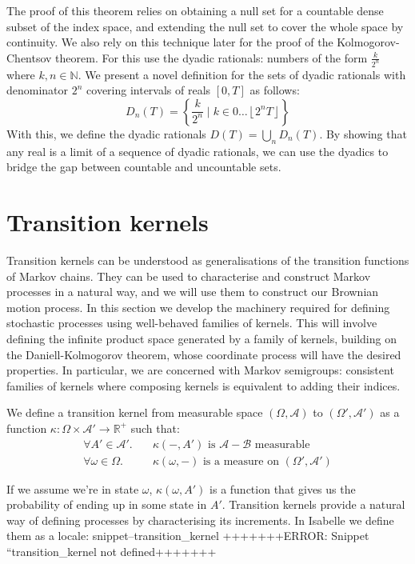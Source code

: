 \documentclass[orivec, envcountsame]{llncs}
\newcommand{\Snippet}[1]{%
\ifcsname snippet--#1\endcsname{\csname snippet--#1\endcsname}%
\else+++++++ERROR: Snippet ``#1 not defined+++++++ \fi}
\begin{document}
The proof of this theorem relies on obtaining a null set for a countable dense subset of the index space, and extending the null set to cover the whole space by continuity. We also rely on this technique later for the proof of the Kolmogorov-Chentsov theorem. For this use the dyadic rationals: numbers of the form \(\frac{k}{2^n}\) where \(k, n\in\mathbb{N}\). We present a novel definition for the sets of dyadic rationals with denominator \(2^n\) covering intervals of reals \([0,T]\) as follows:
 \[D_n(T) = \left\{\frac{k}{2^n} \mid k \in 0 \ldots\left\lfloor 2^nT \right\rfloor\right\}\]
With this, we define the dyadic rationals \(D(T)= \bigcup_n D_n(T)\). By showing that any real is a limit of a sequence of dyadic rationals, we can use the dyadics to bridge the gap between countable and uncountable sets.

\section{Transition kernels}\label{sec:kernel}
Transition kernels can be understood as generalisations of the transition functions of Markov chains. They can be used to characterise and construct Markov processes in a natural way, and we will use them to construct our Brownian motion process. In this section we develop the machinery required for defining stochastic processes using well-behaved families of kernels. This will involve defining the infinite product space generated by a family of kernels, building on the Daniell-Kolmogorov theorem, whose coordinate process will have the desired properties. In particular, we are concerned with Markov semigroups: consistent families of kernels where composing kernels is equivalent to adding their indices.

We define a transition kernel from measurable space \((\Omega, \mathcal{A})\) to \((\Omega', \mathcal{A}')\) as a function \(\kappa: \Omega \times \mathcal{A}' \to \mathbb{R}^+\) such that:
\begin{align*}
\forall A' \in \mathcal{A}'.\quad& \kappa(-, A') \text{ is } \mathcal{A} - \mathcal{B}\text{ measurable}\\
\forall \omega \in \Omega.\quad& \kappa(\omega, -) \text{ is a measure on } (\Omega', \mathcal{A}')
\end{align*}

If we assume we're in state \(\omega\), \(\kappa(\omega, A')\) is a function that gives us the probability of ending up in some state in \(A'\). Transition kernels provide a natural way of defining processes by characterising its increments. 
In Isabelle we define them as a locale:
\Snippet{transition_kernel}
\end{document}
